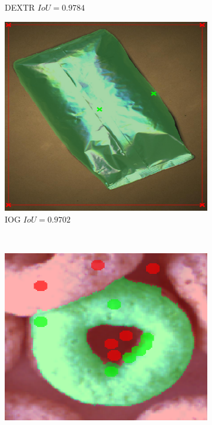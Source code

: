 \begin{figure}
\begin{subfigure}[t]{0.3\textwidth}
		\caption{DEXTR $ IoU = 0.9784 $}
	\end{subfigure}
	\hfill
	\begin{subfigure}[t]{0.3\textwidth}
		\centering
		\includegraphics[width=\textwidth]{figures/appendix/method_predictions/bag21_iog.png}
		\caption{IOG $ IoU = 0.9702 $}
	\end{subfigure}
	\\
	\begin{subfigure}[t]{0.3\textwidth}
		\centering
		\includegraphics[width=\textwidth]{figures/appendix/method_predictions/cereal67_watershed.png}

\end{subfigure}
\end{figure}
